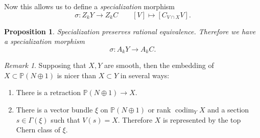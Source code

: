 \documentclass[leqno, openany]{memoir}
\newtheorem{prop}[thm]{Proposition}
\theoremstyle{definition}
\theoremstyle{remark}
\newtheorem{rmk}[thm]{Remark}
\theoremstyle{plain}
\theoremstyle{definition}
\theoremstyle{remark}
\renewcommand{\P}{\mathbb{P}}
\begin{document}
Now this allows us to define a \textit{specialization} morphism
\[ \sigma \colon Z_k Y \to Z_k C \qquad [V] \mapsto [C_{V \cap X} V]. \]
\begin{prop}
    Specialization preserves rational equivalence. Therefore we have a specialization morphism
    \[ \sigma \colon A_k Y \to A_k C. \]
\end{prop}

\begin{rmk}
    Supposing that $X, Y$ are smooth, then the embedding of $X \subset \P(N \oplus 1)$ is nicer than $X \subset Y$ in several ways:
    \begin{enumerate}
        \item There is a retraction $\P(N \oplus 1) \to X$.
        \item There is a vector bundle $\xi$ on $\P(N \oplus 1)$ or rank $\operatorname{codim}_Y X$ and a section $s \in \Gamma(\xi)$ such that $V(s) = X$. Therefore $X$ is represented by the top Chern class of $\xi$.
    \end{enumerate}
\end{rmk}
\end{document}
